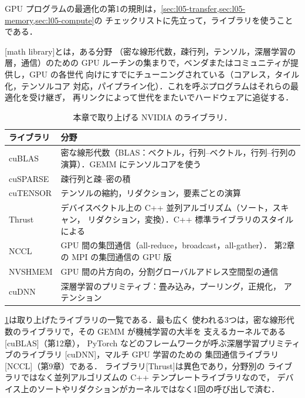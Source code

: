 \documentclass[../main.tex]{subfiles}
\begin{document}
GPU プログラムの最適化の第1の規則は，\cref{sec:l05-transfer,sec:l05-memory,sec:l05-compute}の
チェックリストに先立って，ライブラリを使うことである．

\begin{definition}[数学ライブラリ]
  [math library]とは，ある分野
  （密な線形代数，疎行列，テンソル，深層学習の層，通信）のための GPU
  ルーチンの集まりで，ベンダまたはコミュニティが提供し，GPU の各世代
  向けにすでにチューニングされている（コアレス，タイル化，テンソルコア
  対応，パイプライン化）．これを呼ぶプログラムはそれらの最適化を受け継ぎ，
  再リンクによって世代をまたいでハードウェアに追従する．
\end{definition}

\begin{table}[tb]
  \centering
  \small
  \caption{本章で取り上げる NVIDIA のライブラリ．}
  \label{tab:l05-libraries}
  \begin{tabular}{>{\raggedright\arraybackslash}p{20mm}
                  >{\raggedright\arraybackslash}p{86mm}}
    \toprule
    ライブラリ & 分野 \\
    \midrule
    cuBLAS & 密な線形代数（BLAS：ベクトル，行列--ベクトル，行列--行列の
      演算）．GEMM にテンソルコアを使う \\
    cuSPARSE & 疎行列と疎--密の積 \\
    cuTENSOR & テンソルの縮約，リダクション，要素ごとの演算 \\
    Thrust & デバイスベクトル上の C++ 並列アルゴリズム（ソート，スキャン，
      リダクション，変換）．C++ 標準ライブラリのスタイルによる \\
    NCCL & GPU 間の集団通信（all-reduce，broadcast，all-gather）．
      第2章の MPI の集団通信の GPU 版 \\
    NVSHMEM & GPU 間の片方向の，分割グローバルアドレス空間型の通信 \\
    cuDNN & 深層学習のプリミティブ：畳み込み，プーリング，正規化，
      アテンション \\
    \bottomrule
  \end{tabular}
\end{table}

\cref{tab:l05-libraries}は取り上げたライブラリの一覧である．最も広く
使われる3つは，密な線形代数のライブラリで，その GEMM が機械学習の大半を
支えるカーネルである[cuBLAS]（第12章），
PyTorch などのフレームワークが呼ぶ深層学習プリミティブのライブラリ
[cuDNN]，マルチ GPU 学習のための
集団通信ライブラリ[NCCL]（第9章）である．
ライブラリ[Thrust]は異色であり，分野別の
ライブラリではなく並列アルゴリズムの C++ テンプレートライブラリなので，
デバイス上のソートやリダクションがカーネルではなく1回の呼び出しで済む．
\end{document}
